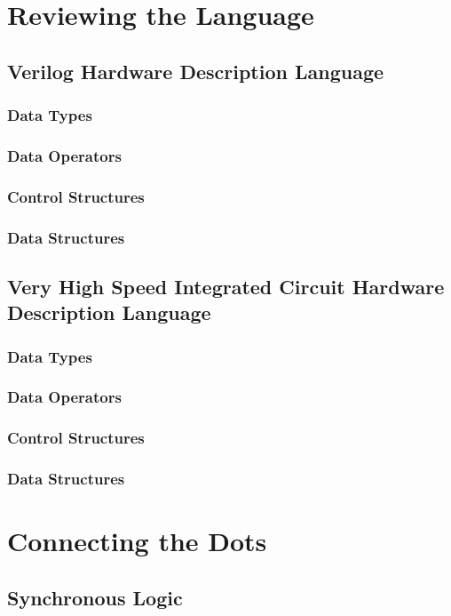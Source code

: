 \documentclass[a4paper,11pt]{book}
\begin{document}
\part{Reviewing the Language}
\label{PART:HDL}
\chapter[Verilog]{Verilog Hardware Description Language}
\section{Data Types}
\section{Data Operators}
\section{Control Structures}
\section{Data Structures}

\chapter[VHDL]{Very High Speed Integrated Circuit Hardware Description Language}
\section{Data Types}
\section{Data Operators}
\section{Control Structures}
\section{Data Structures}

\part{Connecting the Dots}
\label{PART:SYS}



\chapter{Synchronous Logic}
\end{document}
